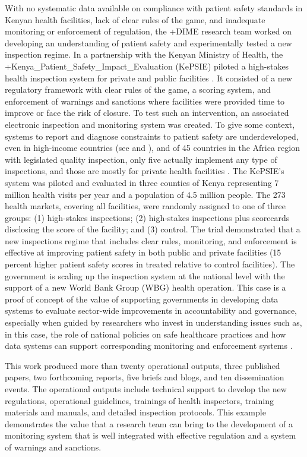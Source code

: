 \documentclass[
]{book}
\begin{document}
With no systematic data available on compliance with patient safety standards in Kenyan health facilities, lack of clear rules of the game, and inadequate monitoring or enforcement of regulation, the +DIME\textbar{} research team worked on developing an understanding of patient safety and experimentally tested a new inspection regime. In a partnership with the Kenyan Ministry of Health, the +Kenya\_Patient\_Safety\_Impact\_Evaluation\textbar{} (KePSIE) piloted a high-stakes health inspection system for private and public facilities \citep[see][]{bedoyaforthcoming}. It consisted of a new regulatory framework with clear rules of the game, a scoring system, and enforcement of warnings and sanctions where facilities were provided time to improve or face the risk of closure. To test such an intervention, an associated electronic inspection and monitoring system was created. To give some context, systems to report and diagnose constraints to patient safety are underdeveloped, even in high-income countries (see \citet{wachter2010} and \citet{longo2005}), and of 45 countries in the Africa region with legislated quality inspection, only five actually implement any type of inspections, and those are mostly for private health facilities \citep{spreng2011}. The KePSIE's system was piloted and evaluated in three counties of Kenya representing 7 million health visits per year and a population of 4.5 million people. The 273 health markets, covering all facilities, were randomly assigned to one of three groups: (1) high-stakes inspections; (2) high-stakes inspections plus scorecards disclosing the score of the facility; and (3) control. The trial demonstrated that a new inspections regime that includes clear rules, monitoring, and enforcement is effective at improving patient safety in both public and private facilities (15 percent higher patient safety scores in treated relative to control facilities). The government is scaling up the inspection system at the national level with the support of a new World Bank Group (WBG) health operation. This case is a proof of concept of the value of supporting governments in developing data systems to evaluate sector-wide improvements in accountability and governance, especially when guided by researchers who invest in understanding issues such as, in this case, the role of national policies on safe healthcare practices and how data systems can support corresponding monitoring and enforcement systems \citep{worldhealthorganizationregionalofficeforafrica2014}.

This work produced more than twenty operational outputs, three published papers, two forthcoming reports, five briefs and blogs, and ten dissemination events. The operational outputs include technical support to develop the new regulations, operational guidelines, trainings of health inspectors, training materials and manuals, and detailed inspection protocols. This example demonstrates the value that a research team can bring to the development of a monitoring system that is well integrated with effective regulation and a system of warnings and sanctions.
\end{document}
